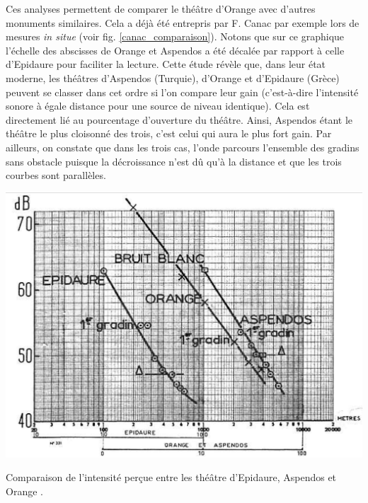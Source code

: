 Ces analyses permettent de comparer le théâtre d'Orange avec d'autres monuments similaires. Cela a déjà été entrepris par F. Canac par exemple lors de mesures \textit{in situe} (voir fig. \ref{canac_comparaison}). Notons que sur ce graphique l'échelle des abscisses de Orange et Aspendos a été décalée par rapport à celle d'Epidaure pour faciliter la lecture. Cette étude \cite[137-162]{canac} révèle que, dans leur état moderne, les théâtres d'Aspendos (Turquie), d'Orange et d'Epidaure (Grèce) peuvent se classer dans cet ordre si l'on compare leur gain (c'est-à-dire l'intensité sonore à égale distance pour une source de niveau identique). Cela est directement lié au pourcentage d'ouverture du théâtre. Ainsi, Aspendos étant le théâtre le plus cloisonné des trois, c'est celui qui aura le plus fort gain. Par ailleurs, on constate que dans les trois cas, l'onde parcours l'ensemble des gradins sans obstacle puisque la décroissance n'est dû qu'à la distance et que les trois courbes sont parallèles.
%
\begin{figureth}
	\includegraphics[width=0.7\linewidth]{images/canac_comparaison}
	\caption[Comparaison de l'intensité perçue entre les théâtre d'Epidaure, Aspendos et Orange.]{Comparaison de l'intensité perçue entre les théâtre d'Epidaure, Aspendos et Orange \footnotemark.}
	\label{canac_comparaison}
\end{figureth}


